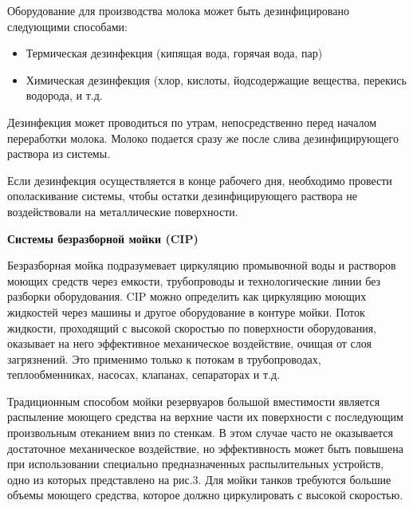 \documentclass[a4paper,12pt,oneside]{extarticle}
\begin{document}
 \begin{flushleft}
	Оборудование для производства молока может быть дезинфицировано следующими способами:
\end{flushleft}	

\begin{itemize}
	\item Термическая дезинфекция (кипящая вода, горячая вода, пар)
	\item Химическая дезинфекция (хлор, кислоты, йодсодержащие вещества, перекись водорода, и т.д.

\end{itemize}

\begin{flushleft}
	Дезинфекция может проводиться по утрам, непосредственно перед началом переработки молока. Молоко подается сразу же после слива дезинфицирующего раствора из системы.
\end{flushleft}
 
 \begin{flushleft}
 	Если дезинфекция осуществляется в конце рабочего дня, необходимо провести ополаскивание системы, чтобы остатки дезинфицирующего раствора не воздействовали на металлические поверхности.
 \end{flushleft}
 
 \begin{flushleft}
	\bfseries Системы безразборной мойки (CIP)
\end{flushleft}	

 \begin{flushleft}
		Безразборная мойка подразумевает циркуляцию промывочной воды и растворов моющих средств через емкости, трубопроводы и технологические линии без разборки оборудования. CIP можно определить как циркуляцию моющих жидкостей через машины и другое оборудование в контуре мойки. Поток жидкости, проходящий с высокой скоростью по поверхности оборудования, оказывает на него эффективное механическое воздействие, очищая от слоя загрязнений. Это применимо только к потокам в трубопроводах, теплообменниках, насосах, клапанах, сепараторах и т.д.
\end{flushleft}	

\begin{flushleft}
		Традиционным способом мойки резервуаров большой вместимости является распыление моющего средства на верхние части их поверхности с последующим произвольным отеканием вниз по стенкам. В этом случае часто не оказывается достаточное механическое воздействие, но эффективность может быть повышена при использовании специально предназначенных распылительных устройств, одно из которых представлено на рис.3. Для мойки танков требуются большие объемы моющего средства, которое должно циркулировать с высокой скоростью.
\end{flushleft}
 
\end{document}

